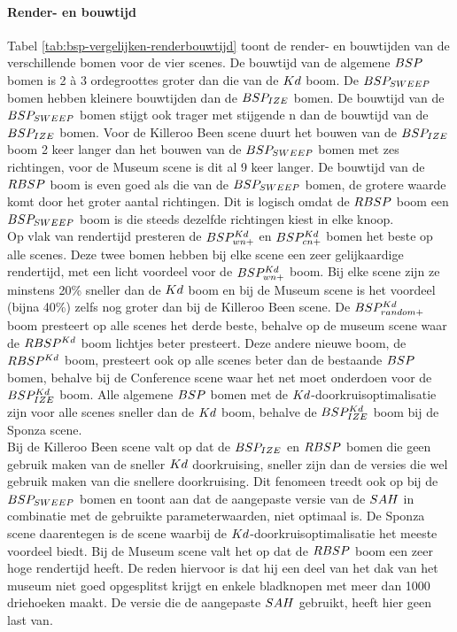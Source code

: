 \paragraph{Render- en bouwtijd}
Tabel \ref{tab:bsp-vergelijken-renderbouwtijd} toont de render- en bouwtijden van de verschillende bomen voor de vier scenes.
De bouwtijd van de algemene $BSP$ bomen is 2 à 3 ordegroottes groter dan die van de $Kd$ boom. 
De $BSP_{SWEEP}$ bomen hebben kleinere bouwtijden dan de $BSP_{IZE}$ bomen.
De bouwtijd van de $BSP_{SWEEP}$ bomen stijgt ook trager met stijgende n dan de bouwtijd van de $BSP_{IZE}$ bomen. 
Voor de Killeroo Been scene duurt het bouwen van de $BSP_{IZE}$ boom 2 keer langer dan het bouwen van de $BSP_{SWEEP}$ bomen met zes richtingen, voor de Museum scene is dit al 9 keer langer. 
De bouwtijd van de $RBSP$ boom is even goed als die van de $BSP_{SWEEP}$ bomen, de grotere waarde komt door het groter aantal richtingen. 
Dit is logisch omdat de $RBSP$ boom een $BSP_{SWEEP}$ boom is die steeds dezelfde richtingen kiest in elke knoop.\\

Op vlak van rendertijd presteren de $BSP^{Kd}_{wn+}$ en $BSP^{Kd}_{cn+}$ bomen het beste op alle scenes.
Deze twee bomen hebben bij elke scene een zeer gelijkaardige rendertijd, met een licht voordeel voor de $BSP^{Kd}_{wn+}$ boom.
Bij elke scene zijn ze minstens 20\% sneller dan de $Kd$ boom en bij de Museum scene is het voordeel (bijna 40\%) zelfs nog groter dan bij de Killeroo Been scene.
De $BSP^{Kd}_{random+}$ boom presteert op alle scenes het derde beste, behalve op de museum scene waar de $RBSP^{Kd}$ boom lichtjes beter presteert.
Deze andere nieuwe boom, de $RBSP^{Kd}$ boom, presteert ook op alle scenes beter dan de bestaande $BSP$ bomen, behalve bij de Conference scene waar het net moet onderdoen voor de $BSP^{Kd}_{IZE}$ boom.
Alle algemene $BSP$ bomen met de $Kd$-doorkruisoptimalisatie zijn voor alle scenes sneller dan de $Kd$ boom, behalve de $BSP^{Kd}_{IZE}$ boom bij de Sponza scene.\\

Bij de Killeroo Been scene valt op dat de $BSP_{IZE}$ en $RBSP$ bomen die geen gebruik maken van de sneller $Kd$ doorkruising, sneller zijn dan de versies die wel gebruik maken van die snellere doorkruising.
Dit fenomeen treedt ook op bij de $BSP_{SWEEP}$ bomen en
toont aan dat de aangepaste versie van de $SAH$ in combinatie met de gebruikte parameterwaarden, niet optimaal is.
De Sponza scene daarentegen is de scene waarbij de $Kd$-doorkruisoptimalisatie het meeste voordeel biedt.
Bij de Museum scene valt het op dat de $RBSP$ boom een zeer hoge rendertijd heeft.
De reden hiervoor is dat hij een deel van het dak van het museum niet goed opgesplitst krijgt en enkele bladknopen met meer dan 1000 driehoeken maakt.
De versie die de aangepaste $SAH$ gebruikt, heeft hier geen last van.

